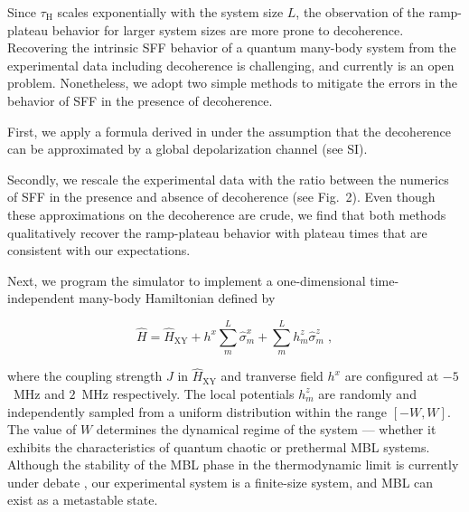 \documentclass[aps,prx,reprint,twocolumn,superscriptaddress,floatfix,nofootinbib]{revtex4-2}
\newcommand{\tauhei}{\tau_{\mathrm{H}}}
\newcommand{\hzero}{\hat{H}_{\mathrm{XY}}}
\begin{document}
Since $\tauhei$ scales
exponentially with the system size $L$, the observation of the ramp-plateau behavior for larger system sizes are more prone to decoherence.
Recovering the intrinsic SFF behavior of a quantum many-body system from the experimental data including decoherence is challenging, and currently is an open problem.
Nonetheless, we adopt two simple methods to mitigate the errors in the behavior of SFF in the presence of decoherence.

First, we apply a formula derived in \cite{ZollerSFF2021} under the assumption that the decoherence can be approximated by a global depolarization channel (see SI).

Secondly, we rescale the experimental data with the ratio between the numerics of SFF in the presence and absence of decoherence (see Fig.~2). Even though these approximations on the decoherence are crude,
we find that both methods qualitatively recover the ramp-plateau behavior with plateau times that are consistent with our expectations.

Next, we program the
simulator to implement a one-dimensional time-independent many-body Hamiltonian  defined by

\begin{equation} \label{eq:model_ham}
    \hat{H} = \hzero +h^x \sum_m^L \hat{\sigma}_{m}^x + \sum_{m}^L h^z_m \hat{\sigma}_m^z \;,
\end{equation}

where the coupling strength $J$ in $\hzero$ and tranverse field $h^x$ are configured at $-5$~MHz and  $2$~MHz respectively. The local potentials $h^z_m$ are randomly and independently sampled from a uniform distribution within the range $[-W, W]$. The value of $W$ determines the dynamical regime of the system --- whether it exhibits the characteristics of quantum chaotic or prethermal MBL systems. Although the stability of the MBL phase in the thermodynamic limit is currently under debate \cite{chaoschallengeMBL, abanin2021distinguishing}, our experimental system is a finite-size system, and MBL can exist as a metastable state.
\end{document}
